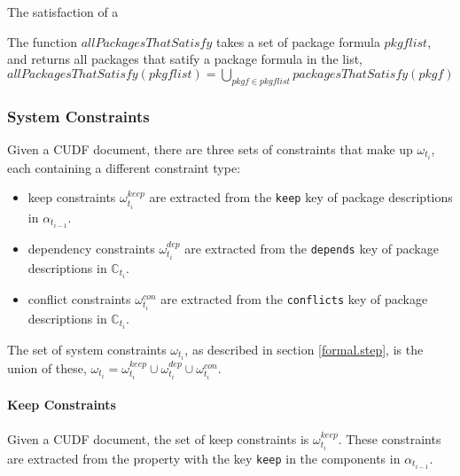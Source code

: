 The satisfaction of a 
\begin{defs}
The function $allPackagesThatSatisfy$ takes a set of package formula $pkgflist$, and returns all packages that satify a package formula in the list,
$allPackagesThatSatisfy(pkgflist) = \bigcup \limits_{pkgf \in pkgflist} packagesThatSatisfy(pkgf)$ 
\end{defs}

\subsubsection{System Constraints}
Given a CUDF document, there are three sets of constraints that make up $\omega_{t_i}$, each containing a different constraint type:
\begin{itemize}
  \item keep constraints $\omega_{t_i}^{keep}$ are extracted from the \verb+keep+ key of package descriptions in $\alpha_{t_{i-1}}$.
  \item dependency constraints $\omega_{t_i}^{dep}$ are extracted from the \verb+depends+ key of package descriptions in $\mathbb{C}_{t_i}$.
  \item conflict constraints $\omega_{t_i}^{con}$ are extracted from the \verb+conflicts+ key of package descriptions in $\mathbb{C}_{t_i}$.
\end{itemize}
The set of system constraints $\omega_{t_i}$, as described in section \ref{formal.step}, is the union of these,
$\omega_{t_i} =  \omega_{t_i}^{keep} \cup \omega_{t_i}^{dep} \cup \omega_{t_i}^{con}$.


\paragraph{Keep Constraints}
Given a CUDF document, the set of keep constraints is $\omega_{t_i}^{keep}$.
These constraints are extracted from the property with the key \texttt{keep} in the components in $\alpha_{t_{i-1}}$.
 
